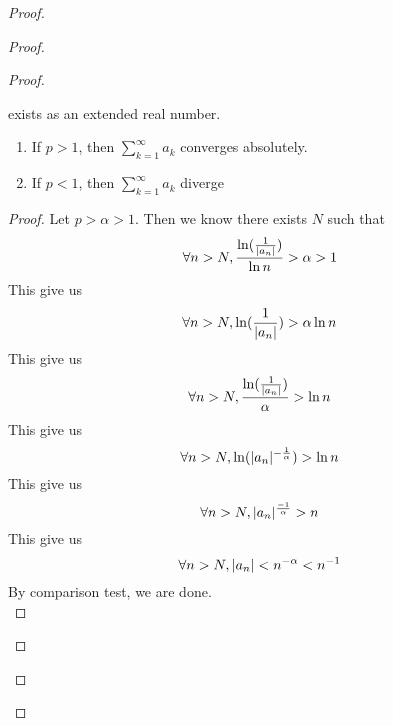 \documentclass{report}
\begin{document}
\begin{proof}
\begin{proof}
\begin{proof}
\begin{question}{}{}
\begin{enumerate}
\[    \]
    exists as an extended real number.
    \begin{enumerate}
        \item If \( p > 1 \), then \(\sum_{k=1}^{\infty} a_k\) converges absolutely.
        \item If \( p < 1 \), then $\sum _{k=1}^\infty a_k$ diverge
    \end{enumerate}
\end{enumerate}
\end{question}
\begin{proof}
Let $p>\alpha >1$.  Then we know there exists $N$ such that
 \begin{equation}
\forall n>N, \frac{\ln (\frac{1}{|a_n|})}{\ln n}>\alpha >1
\end{equation}
This give us
\begin{equation}
\forall n>N, \ln(\frac{1}{|a_n|})>\alpha \ln n 
\end{equation}
This give us
\begin{equation}
\forall n>N, \frac{\ln (\frac{1}{|a_n|})}{\alpha }>\ln n
\end{equation}
This give us
\begin{equation}
\forall n>N, \ln (|a_n|^{-\frac{1}{\alpha }})>\ln n
\end{equation}
This give us
\begin{equation}
\forall n>N, |a_n|^{\frac{-1}{\alpha }}>n
\end{equation}
This give us
\begin{equation}
\forall n>N, |a_n|<n^{-\alpha }<n^{-1}
\end{equation}
By comparison test, we are done.\\


\end{proof}
\end{proof}
\end{proof}
\end{proof}
\end{document}
